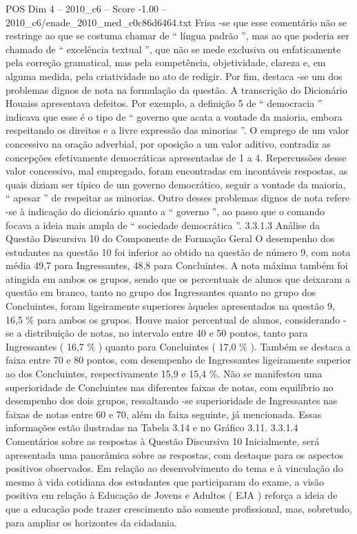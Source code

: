 \begin{textsample}{POS Dim 4 – 2010\_c6 – Score -1.00 – 2010\_c6/enade\_2010\_med\_c0c86d6464.txt}
Frisa -se que esse comentário não se restringe ao que se costuma chamar de “ língua padrão ”, mas ao que poderia ser chamado de “ excelência textual ”, que não se mede exclusiva ou enfaticamente pela correção gramatical, mas pela competência, objetividade, clareza e, em alguma medida, pela criatividade no ato de redigir.
Por fim, destaca -se um dos problemas dignos de nota na formulação da questão.
A transcrição do Dicionário Houaiss apresentava defeitos.
Por exemplo, a definição 5 de “ democracia ” indicava que esse é o tipo de “ governo que acata a vontade da maioria, embora respeitando os direitos e a livre expressão das minorias ”.
O emprego de um valor concessivo na oração adverbial, por oposição a um valor aditivo, contradiz as concepções efetivamente democráticas apresentadas de 1 a 4.
Repercussões desse valor concessivo, mal empregado, foram encontradas em incontáveis respostas, as quais diziam ser típico de um governo democrático, seguir a vontade da maioria, “ apesar ” de respeitar as minorias.
Outro desses problemas dignos de nota refere -se à indicação do dicionário quanto a “ governo ”, ao passo que o comando focava a ideia mais ampla de “ sociedade democrática ”. 3.3.1.3 Análise da Questão Discursiva 10 do Componente de Formação Geral O desempenho dos estudantes na questão 10 foi inferior ao obtido na questão de número 9, com nota média 49,7 para Ingressantes, 48,8 para Concluintes.
A nota máxima também foi atingida em ambos os grupos, sendo que os percentuais de alunos que deixaram a questão em branco, tanto no grupo dos Ingressantes quanto no grupo dos Concluintes, foram ligeiramente superiores àqueles apresentados na questão 9, 16,5 \% para ambos os grupos.
Houve maior percentual de alunos, considerando -se a distribuição de notas, no intervalo entre 40 e 50 pontos, tanto para Ingressantes ( 16,7 \% ) quanto para Concluintes ( 17,0 \% ).
Também se destaca a faixa entre 70 e 80 pontos, com desempenho de Ingressantes ligeiramente superior ao dos Concluintes, respectivamente 15,9 e 15,4 \%.
Não se manifestou uma superioridade de Concluintes nas diferentes faixas de notas, com equilíbrio no desempenho dos dois grupos, ressaltando -se superioridade de Ingressantes nas faixas de notas entre 60 e 70, além da faixa seguinte, já mencionada.
Essas informações estão ilustradas na Tabela 3.14 e no Gráfico 3.11. 3.3.1.4 Comentários sobre as respostas à Questão Discursiva 10 Inicialmente, será apresentada uma panorâmica sobre as respostas, com destaque para os aspectos positivos observados.
Em relação ao desenvolvimento do tema e à vinculação do mesmo à vida cotidiana dos estudantes que participaram do exame, a visão positiva em relação à Educação de Jovens e Adultos ( EJA ) reforça a ideia de que a educação pode trazer crescimento não somente profissional, mas, sobretudo, para ampliar os horizontes da cidadania.

\end{textsample}
